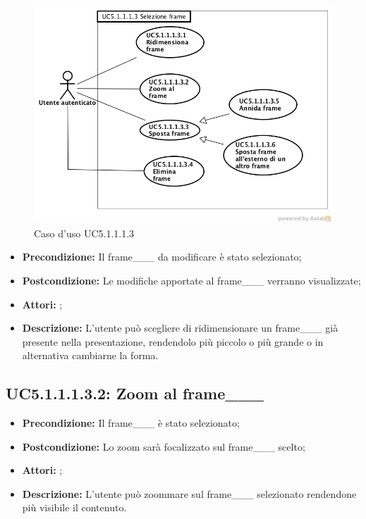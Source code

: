 \begin{figure}[h]
	\begin{center}
	\includegraphics[scale=0.4]{diagram/UC5-1-1-1-3.png}
	\caption{Caso d'uso UC5.1.1.1.3}
	\end{center}
\end{figure}
\begin{itemize}
	\item \textbf{Precondizione:} Il frame___ da modificare è stato selezionato;
	\item \textbf{Postcondizione:} Le modifiche apportate al frame___ verranno visualizzate;
	\item \textbf{Attori:} ;
	\item \textbf{Descrizione:} L'utente può scegliere di ridimensionare un frame___ già presente nella presentazione, rendendolo più piccolo o più grande o in alternativa cambiarne la forma.
\end{itemize}
\subsection{ UC5.1.1.1.3.2: Zoom al frame___}

\begin{itemize}
	\item \textbf{Precondizione:} Il frame___ è stato selezionato;
	\item \textbf{Postcondizione:} Lo zoom sarà focalizzato sul frame___ scelto;
	\item \textbf{Attori:} ;
	\item \textbf{Descrizione:} L'utente può zoommare sul frame___ selezionato rendendone più visibile il contenuto.
\end{itemize}
